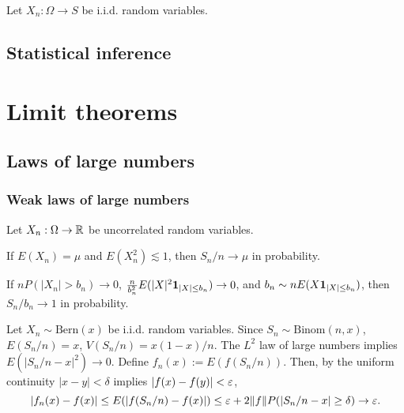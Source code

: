 \documentclass{../note}
\def\Bern{\mathrm{Bern}}
\def\Binom{\mathrm{Binom}}
\begin{document}
\begin{prb}
Let $X_n:\Omega\to S$ be i.i.d. random variables.

\end{prb}





\chapter{Statistical inference}















\part{Limit theorems}



\chapter{Laws of large numbers}



\section{Weak laws of large numbers}
\begin{prb}
Let $X_n:\Omega\to\mathbb{R}$ be uncorrelated random variables.
\begin{parts}
\item If $E(X_n)=\mu$ and $E(X_n^2)\lesssim1$, then $S_n/n\to\mu$ in probability.
\item If $nP(|X_n|>b_n)\to0$, $\frac n{b_n^2}E(|X|^2\mathbf{1}_{|X|\le b_n})\to0$, and $b_n\sim nE(X\mathbf{1}_{|X|\le b_n})$, then $S_n/b_n\to1$ in probability.
\end{parts}

\end{prb}

\begin{prb}
Let $X_n\sim\Bern(x)$ be i.i.d. random variables.
Since $S_n\sim\Binom(n,x)$, $E(S_n/n)=x$, $V(S_n/n)=x(1-x)/n$.
The $L^2$ law of large numbers implies $E(|S_n/n-x|^2)\to0$.
Define $f_n(x):=E(f(S_n/n))$.
Then, by the uniform continuity $|x-y|<\delta$ implies $|f(x)-f(y)|<\varepsilon$,
\[|f_n(x)-f(x)|\le E(|f(S_n/n)-f(x)|)\le\varepsilon+2\|f\|P(|S_n/n-x|\ge\delta)\to\varepsilon.\]
\end{prb}
\end{document}

